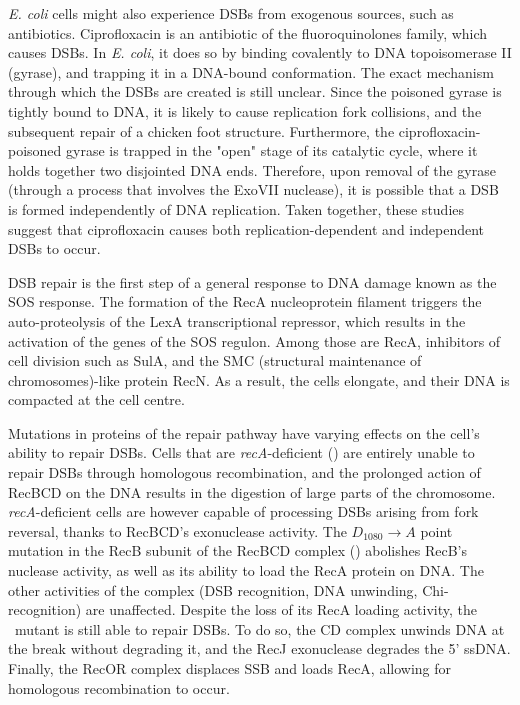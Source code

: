 \emph{E. coli} cells might also experience DSBs from exo\-genous sources, such as anti\-biotics. Ciprofloxacin is an antibiotic of the fluoro\-quinolones family, which causes DSBs. In \emph{E. coli}, it does so by binding covalently to DNA topoisomerase II (gyrase), and trapping it in a DNA-bound conformation\cite{Kohanski2010}. The exact mechanism through which the DSBs are created is still unclear. Since the poisoned gyrase is tightly bound to DNA, it is likely to cause replication fork collisions\cite{Wentzell2000, Drlica2008}, and the subsequent repair of a chicken foot structure. Furthermore, the ciprofloxacin-poisoned gyrase is trapped in the "open" stage of its catalytic cycle, where it holds together two disjointed DNA ends. Therefore, upon removal of the gyrase (through a process that involves the ExoVII nuclease\cite{Huang2021}), it is possible that a DSB is formed independently of DNA replication\cite{Zhao2006}. Taken together, these studies suggest that ciprofloxacin causes both replication-dependent and independent DSBs to occur.

DSB repair is the first step of a general response to DNA damage known as the SOS response\cite{Baharoglu2014}. The formation of the RecA nucleoprotein filament triggers the auto-proteolysis of the LexA transcriptional repressor, which results in the activation of the genes of the SOS regulon. Among those are RecA, inhibitors of cell division such as SulA, and the SMC (structural maintenance of chromosomes)-like protein RecN. As a result, the cells elongate\cite{Bos2015}, and their DNA is compacted at the cell centre\cite{Odsbu2014}.

Mutations in proteins of the repair pathway have varying effects on the cell's ability to repair DSBs. Cells that are \emph{recA}-deficient (\dreca) are entirely unable to repair DSBs through homologous recombination, and the prolonged action of RecBCD on the DNA results in the digestion of large parts of the chromosome\cite{Horii1968, Chow2007}. \emph{recA}-deficient cells are however capable of processing DSBs arising from fork reversal, thanks to RecBCD's exonuclease activity\cite{Seigneur1998, Michel2001}. The $D_{1080} \rightarrow A$ point mutation in the RecB subunit of the RecBCD complex (\teneighty) abolishes RecB's nuclease activity, as well as its ability to load the RecA protein on DNA\cite{Yu1998, Wang2000}. The other activities of the complex (DSB recognition, DNA unwinding, Chi-recognition) are unaffected\cite{Anderson1999}. Despite the loss of its RecA loading activity, the \teneighty\ mutant is still able to repair DSBs. To do so, the \teneighty CD complex unwinds DNA at the break without degrading it, and the RecJ exonuclease degrades the 5' ssDNA. Finally, the RecOR complex displaces SSB and loads RecA, allowing for homologous recombination to occur\cite{Ivancic-Bace_2003}.

